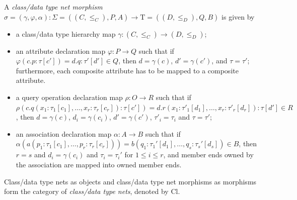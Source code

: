 \documentclass[10pt, a4paper]{isov2}
\newcommand{\Tau}{\mathrm{T}}
\begin{document}
A \emph{class/data type net morphism}
$\sigma = (\gamma, \varphi, \alpha) : \Sigma = ((C,
{\leq}_C), P, A) \to \Tau = ((D, {\leq}_D),\allowbreak
Q,\allowbreak B)$ is given by
%
 \begin{itemize} [label={--}, leftmargin=*]
  \item a class/data type hierarchy map $\gamma : (C, {\leq_C}) \to (D,
{\leq_D})$;

  \item an attribute declaration map $\varphi : P \to Q$ such that if
$\varphi({c.p : \tau[c']}) = {d.q : \tau'[d']} \in Q$, then
$d = \gamma(c)$, $d' = \gamma(c')$, and $\tau = \tau'$; furthermore,
each composite attribute has to be mapped to a composite attribute.

  \item a query operation declaration map $\rho : O \to R$ such that if
$\rho(c.q(x_1 : \tau_1[c_1], \dots, x_r : \tau_r[c_r]) : \tau[c']) =
d.r(x_1 : \tau'_1[d_1], \dots, x_r : \tau'_r[d_r]) : \tau[d'] \in R$, 
then $d = \gamma(c)$, $d_i = \gamma(c_i)$, 
$d' = \gamma(c')$, $\tau'_i = \tau_i$ and $\tau = \tau'$;

  \item an association declaration map $\alpha : A \to B$ such that if
$\alpha(a(p_1 : \tau_1[c_1], \dots, p_r : \tau_r[c_r])) = b(q_1 :
\tau_1'[d_1], \dots, q_s : \tau_s'[d_s]) \in B$,
then $r = s$ and $d_i = \gamma(c_i)$ and $\tau_i = \tau_i'$ for
$1 \leq i \leq r$, and member ends owned by the association are mapped
into owned member ends.
 \end{itemize} 

Class/data type nets as objects and class/data type net morphisms as
morphisms form the category of \emph{class/data type nets}, denoted by
$\mathrm{Cl}$.
\end{document}
